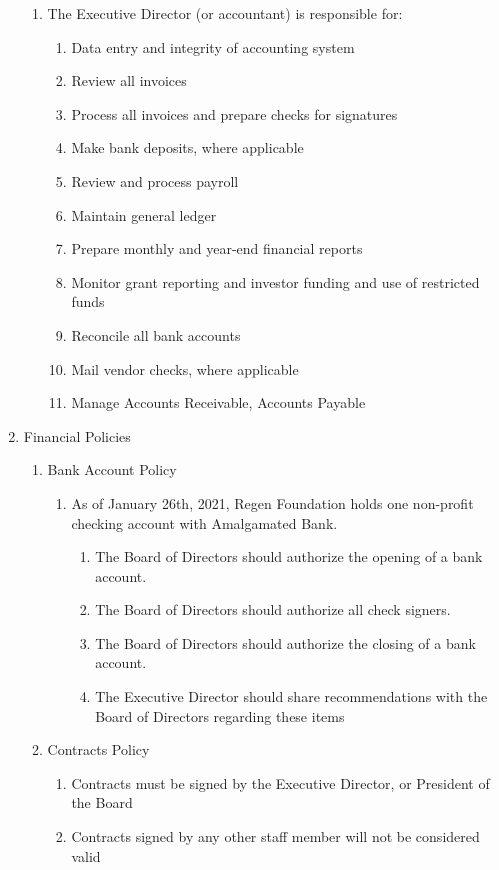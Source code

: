\documentclass{article}
\begin{document}
\begin{enumerate}
\begin{enumerate}
\item The Executive Director (or accountant) is responsible for:
\begin{enumerate}
\item Data entry and integrity of accounting system
\item Review all invoices
\item Process all invoices and prepare checks for signatures
\item Make bank deposits, where applicable
\item Review and process payroll 
\item Maintain general ledger
\item Prepare monthly and year-end financial reports
\item Monitor grant reporting and investor funding and use of restricted funds
\item Reconcile all bank accounts
\item Mail vendor checks, where applicable 
\item Manage Accounts Receivable, Accounts Payable
\end{enumerate}
\end{enumerate}
\item Financial Policies
\begin{enumerate}
\item Bank Account Policy 
\begin{enumerate}
\item As of January 26th, 2021, Regen Foundation holds one non-profit checking account with Amalgamated Bank.
\begin{enumerate}
\item The Board of Directors should authorize the opening of a bank account.
\item The Board of Directors should authorize all check signers.
\item The Board of Directors should authorize the closing of a bank account.
\item The Executive Director should share recommendations with the Board of Directors regarding these items
\end{enumerate}
\end{enumerate}
\item Contracts Policy
\begin{enumerate}
\item Contracts must be signed by the Executive Director, or President of the Board
\item Contracts signed by any other staff member will not be considered valid

\end{enumerate}
\end{enumerate}
\end{enumerate}
\end{document}
